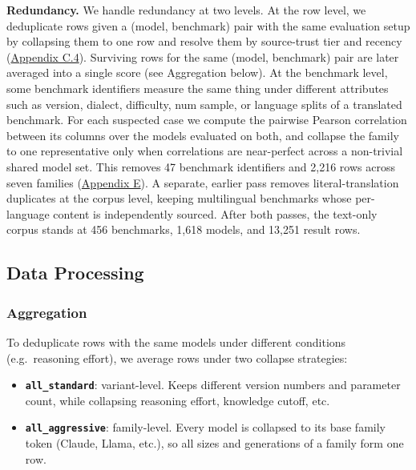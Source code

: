 \documentclass{article} %
\providecommand{\tightlist}{%
  \setlength{\itemsep}{0pt}\setlength{\parskip}{0pt}}
\begin{document}
\textbf{Redundancy.} We handle redundancy at two levels. At the row level, we deduplicate rows given a (model, benchmark) pair with the same evaluation setup by collapsing them to one row and resolve
them by source-trust tier and recency (\href{Appendix-Methods\#C.4\%20Duplicate\%20detection\%20and\%20integrity\%20checks}{Appendix C.4}). Surviving rows for the same (model, benchmark) pair are
later averaged into a single score (see Aggregation below). At the benchmark level, some benchmark identifiers measure the same thing under different attributes such as version, dialect, difficulty,
num sample, or language splits of a translated benchmark. For each suspected case we compute the pairwise Pearson correlation between its columns over the models evaluated on both, and collapse the
family to one representative only when correlations are near-perfect across a non-trivial shared model set. This removes 47 benchmark identifiers and 2,216 rows across seven families
(\href{Appendix-Methods\#E\%20Score-redundancy\%20pruning}{Appendix E}). A separate, earlier pass removes literal-translation duplicates at the corpus level, keeping multilingual benchmarks whose
per-language content is independently sourced. After both passes, the text-only corpus stands at 456 benchmarks, 1,618 models, and 13,251 result rows.

\hypertarget{data-processing}{%
\subsection{Data Processing}\label{data-processing}}

\hypertarget{aggregation}{%
\subsubsection{Aggregation}\label{aggregation}}

To deduplicate rows with the same models under different conditions (e.g.~reasoning effort), we average rows under two collapse strategies:

\begin{itemize}
\tightlist
\item
  \textbf{\texttt{all\_standard}}: variant-level. Keeps different version numbers and parameter count, while collapsing reasoning effort, knowledge cutoff, etc.
\item
  \textbf{\texttt{all\_aggressive}}: family-level. Every model is collapsed to its base family token (Claude, Llama, etc.), so all sizes and generations of a family form one row.
\end{itemize}
\end{document}
